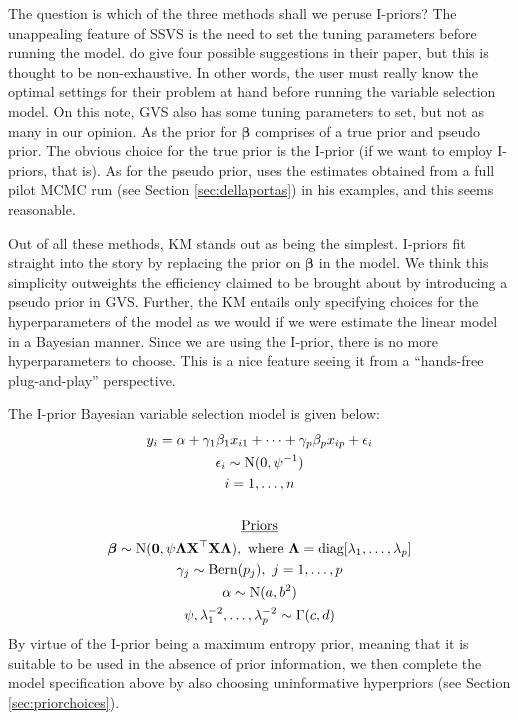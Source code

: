 The question is which of the three methods shall we peruse I-priors? The unappealing feature of SSVS is the need to set the tuning parameters before running the model. \cite{George1993} do give four possible suggestions in their paper, but this is thought to be non-exhaustive. In other words, the user must really know the optimal settings for their problem at hand before running the variable selection model. On this note, GVS also has some tuning parameters to set, but not as many in our opinion. As the prior for $\boldsymbol\beta$ comprises of a true prior and pseudo prior. The obvious choice for the true prior is the I-prior (if we want to employ I-priors, that is). As for the pseudo prior, \cite{Ntzoufras2008} uses the estimates obtained from a full pilot MCMC run (see Section \ref{sec:dellaportas}) in his examples, and this seems reasonable. 

Out of all these methods, KM stands out as being the simplest. I-priors fit straight into the story by replacing the prior on $\boldsymbol\beta$ in the model. We think this simplicity outweights the efficiency claimed to be brought about by introducing a pseudo prior in GVS. Further, the KM entails only specifying choices for the hyperparameters of the model as we would if we were estimate the linear model in a Bayesian manner. Since we are using the I-prior, there is no more hyperparameters to choose. This is a nice feature seeing it from a ``hands-free plug-and-play'' perspective.

The I-prior Bayesian variable selection model is given below:
\begin{align}\label{eq:ipriorbvs}
	\begin{gathered} 
		y_i = \alpha + \gamma_1\beta_1 x_{i1} + \dots + \gamma_p\beta_p x_{ip} + \epsilon_i \\
		\epsilon_i \sim \text{N}(0, \psi^{-1})  \\
		i=1,\dots,n\\
		\\
		\text{\underline{Priors}} \\
		\boldsymbol\beta \sim \text{N}(\mathbf 0, \psi\boldsymbol\Lambda \mathbf X ^\top \mathbf X \boldsymbol\Lambda), \text{ where } \boldsymbol\Lambda = \text{diag}[\lambda_1, \dots, \lambda_p]\\
		\gamma_j \sim \text{Bern}(p_j), \ j=1,\dots,p \\
		\alpha \sim \operatorname{N}(a,b^2) \\
		\psi, \lambda_1^{-2}, \dots,  \lambda_p^{-2} \sim \Gamma(c,d) \\
	\end{gathered}
\end{align}
By virtue of the I-prior being a maximum entropy prior, meaning that it is suitable to be used in the absence of prior information, we then complete the model specification above by also choosing uninformative hyperpriors (see Section \ref{sec:priorchoices}).

